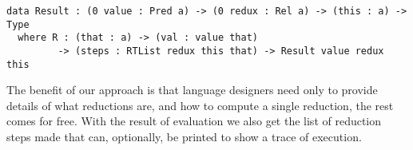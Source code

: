 \begin{Verbatim}
data Result : (0 value : Pred a) -> (0 redux : Rel a) -> (this : a) -> Type
  where R : (that : a) -> (val : value that)
         -> (steps : RTList redux this that) -> Result value redux this
\end{Verbatim}

The benefit of our approach is that language designers need only to provide details of what reductions are, and how to compute a single reduction, the rest comes for free.
%
With the result of evaluation we also get the list of reduction steps made that can, optionally, be printed to show a trace of execution.

